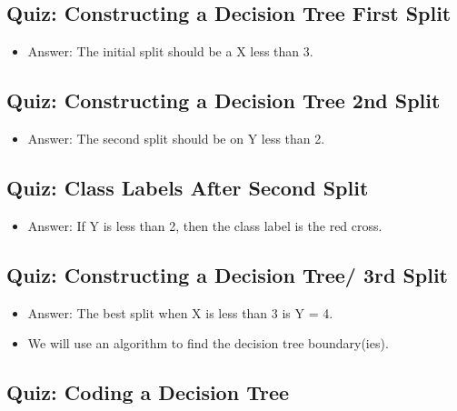 \documentclass[12pt]{report}
\begin{document}
\subsection{Quiz: Constructing a Decision Tree First Split}

\begin{itemize}

\item Answer: The initial split should be a X less than 3. 

\end{itemize}

\subsection{Quiz: Constructing a Decision Tree 2nd Split}

\begin{itemize}

\item Answer: The second split should be on Y less than 2. 

\end{itemize}

\subsection{Quiz: Class Labels After Second Split}

\begin{itemize}

\item Answer: If Y is less than 2, then the class label is the red cross. 

\end{itemize}

\subsection{Quiz: Constructing a Decision Tree/ 3rd Split}

\begin{itemize}

\item Answer: The best split when X is less than 3 is Y = 4. 

\item We will use an algorithm to find the decision tree boundary(ies). 

\end{itemize}

\subsection{Quiz: Coding a Decision Tree}
\end{document}
